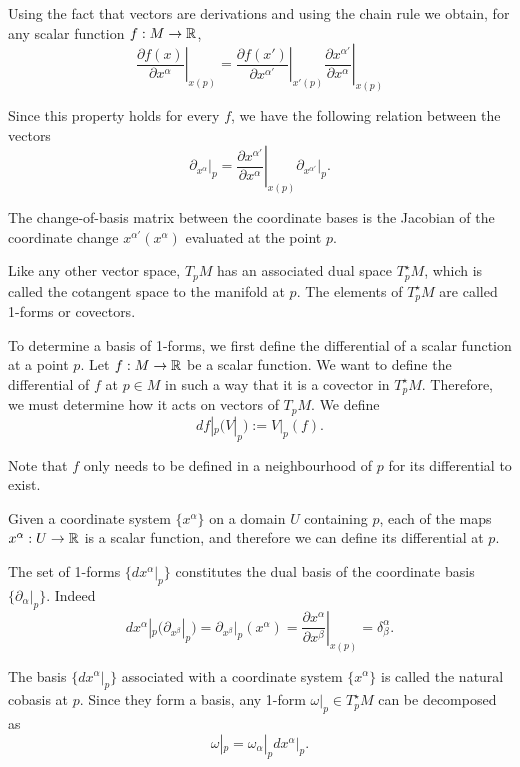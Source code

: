 \begin{points}
\item Using the fact that vectors are derivations and using the chain rule we obtain, for any scalar function $f:M\to\mathbb{R}$,
\[
  \left.\frac{\partial f(x)}{\partial x^\alpha}\right|_{x(p)}=\left.\frac{\partial f(x')}{\partial x^{\alpha'}}\right|_{x'(p)}\left.\frac{\partial x^{\alpha'}}{\partial x^\alpha}\right|_{x(p)}
\]

\item Since this property holds for every $f$, we have the following relation between the vectors
\[
  \partial_{x^\alpha}|_p=\left.\frac{\partial x^{\alpha'}}{\partial x^\alpha}\right|_{x(p)}\partial_{x^{\alpha'}}\big|_p .
\]

\item The change-of-basis matrix between the coordinate bases is the Jacobian of the coordinate change $x^{\alpha'}(x^\alpha)$ evaluated at the point $p$.

\item Like any other vector space, $T_pM$ has an associated dual space $T^\star_pM$, which is called the cotangent space to the manifold at $p$. The elements of $T^\star_pM$ are called 1-forms or covectors.

\item To determine a basis of 1-forms, we first define the differential of a scalar function at a point $p$. Let $f:M\to\mathbb{R}$ be a scalar function. We want to define the differential of $f$ at $p\in M$ in such a way that it is a covector in $T^\star_pM$. Therefore, we must determine how it acts on vectors of $T_pM$. We define
\[
  df|_p(V|_p):=V|_p(f).
\]

\item Note that $f$ only needs to be defined in a neighbourhood of $p$ for its differential to exist.

\item Given a coordinate system $\{x^\alpha\}$ on a domain $U$ containing $p$, each of the maps $x^\alpha:U\to\mathbb{R}$ is a scalar function, and therefore we can define its differential at $p$.

\item The set of 1-forms $\{dx^\alpha|_p\}$ constitutes the dual basis of the coordinate basis $\{\partial_\alpha|_p\}$. Indeed
\[
  dx^\alpha|_p(\partial_{x^\beta}|_p)=\partial_{x^\beta}|_p(x^\alpha)=\left.\frac{\partial x^\alpha}{\partial x^\beta}\right|_{x(p)}=\delta^\alpha_\beta .
\]

\item The basis $\{dx^\alpha|_p\}$ associated with a coordinate system $\{x^\alpha\}$ is called the natural cobasis at $p$. Since they form a basis, any 1-form $\omega|_p\in T^\star_pM$ can be decomposed as
\[
  \omega|_p=\omega_\alpha|_pdx^\alpha|_p .
\]


\end{points}
